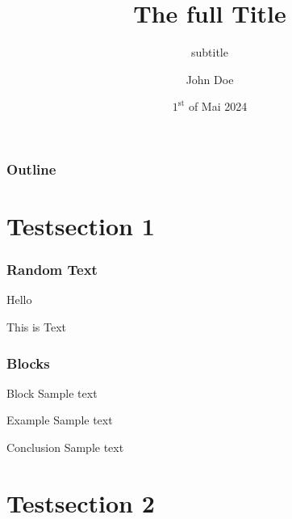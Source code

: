 \documentclass[aspectratio=169]{beamer}
\title[small title]{The full Title}
\subtitle{subtitle}
\author{John Doe}
\institute[TP III]{Chair for theoretical Physics III}
\date[01.05.2024]{$1^{\text{st}}$ of Mai 2024}
\begin{document}
{
    \begin{frame}[t,plain]
        \maketitle
    \end{frame}
}

\begin{frame}
    \frametitle{Outline}

    \tableofcontents

\end{frame}

\section{Testsection 1}

\begin{frame}
    \frametitle{Random Text}

    Hello\pause
    
    This is Text
\end{frame}

\begin{frame}
    \frametitle{Blocks}

    \begin{block}{Block}
        Sample text
    \end{block}

    \begin{exampleblock}{Example}
        Sample text
    \end{exampleblock}

    \begin{alertblock}{Conclusion}
        Sample text
    \end{alertblock}
\end{frame}

\section{Testsection 2}
\end{document}
